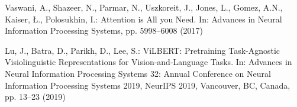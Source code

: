 \documentclass[runningheads]{llncs}
\begin{document}
\begin{thebibliography}{10}
Vaswani, A., Shazeer, N., Parmar, N., Uszkoreit, J., Jones, L., Gomez, A.N., Kaiser, Ł., Polosukhin, I.: Attention is All you Need. In: Advances in Neural Information Processing Systems, pp. 5998--6008 (2017)

Lu, J., Batra, D., Parikh, D., Lee, S.: ViLBERT: Pretraining Task-Agnostic Visiolinguistic Representations for Vision-and-Language Tasks. In: Advances in Neural Information Processing Systems 32: Annual Conference on Neural Information Processing Systems 2019, NeurIPS 2019, Vancouver, BC, Canada, pp. 13--23 (2019)

\end{thebibliography}
\end{document}
